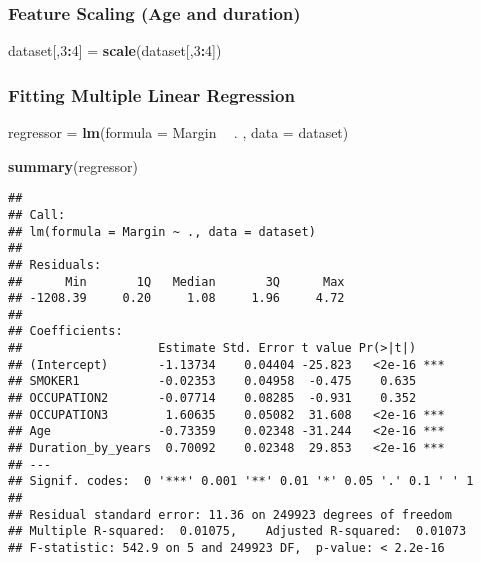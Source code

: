 \documentclass[]{article}
\newenvironment{Shaded}{\begin{snugshade}}{\end{snugshade}}
\newcommand{\KeywordTok}[1]{\textcolor[rgb]{0.13,0.29,0.53}{\textbf{#1}}}
\newcommand{\DataTypeTok}[1]{\textcolor[rgb]{0.13,0.29,0.53}{#1}}
\newcommand{\DecValTok}[1]{\textcolor[rgb]{0.00,0.00,0.81}{#1}}
\newcommand{\StringTok}[1]{\textcolor[rgb]{0.31,0.60,0.02}{#1}}
\newcommand{\OperatorTok}[1]{\textcolor[rgb]{0.81,0.36,0.00}{\textbf{#1}}}
\newcommand{\NormalTok}[1]{#1}
\begin{document}
\subsubsection{Feature Scaling (Age and
duration)}\label{feature-scaling-age-and-duration}

\begin{Shaded}
\begin{Highlighting}[]
\NormalTok{dataset[,}\DecValTok{3}\OperatorTok{:}\DecValTok{4}\NormalTok{] =}\StringTok{ }\KeywordTok{scale}\NormalTok{(dataset[,}\DecValTok{3}\OperatorTok{:}\DecValTok{4}\NormalTok{])}
\end{Highlighting}
\end{Shaded}

\subsubsection{Fitting Multiple Linear
Regression}\label{fitting-multiple-linear-regression}

\begin{Shaded}
\begin{Highlighting}[]
\NormalTok{regressor =}\StringTok{ }\KeywordTok{lm}\NormalTok{(}\DataTypeTok{formula =}\NormalTok{ Margin }\OperatorTok{~}\StringTok{ }\NormalTok{. ,}
               \DataTypeTok{data =}\NormalTok{ dataset)}

\KeywordTok{summary}\NormalTok{(regressor)}
\end{Highlighting}
\end{Shaded}

\begin{verbatim}
## 
## Call:
## lm(formula = Margin ~ ., data = dataset)
## 
## Residuals:
##      Min       1Q   Median       3Q      Max 
## -1208.39     0.20     1.08     1.96     4.72 
## 
## Coefficients:
##                   Estimate Std. Error t value Pr(>|t|)    
## (Intercept)       -1.13734    0.04404 -25.823   <2e-16 ***
## SMOKER1           -0.02353    0.04958  -0.475    0.635    
## OCCUPATION2       -0.07714    0.08285  -0.931    0.352    
## OCCUPATION3        1.60635    0.05082  31.608   <2e-16 ***
## Age               -0.73359    0.02348 -31.244   <2e-16 ***
## Duration_by_years  0.70092    0.02348  29.853   <2e-16 ***
## ---
## Signif. codes:  0 '***' 0.001 '**' 0.01 '*' 0.05 '.' 0.1 ' ' 1
## 
## Residual standard error: 11.36 on 249923 degrees of freedom
## Multiple R-squared:  0.01075,    Adjusted R-squared:  0.01073 
## F-statistic: 542.9 on 5 and 249923 DF,  p-value: < 2.2e-16
\end{verbatim}
\end{document}
